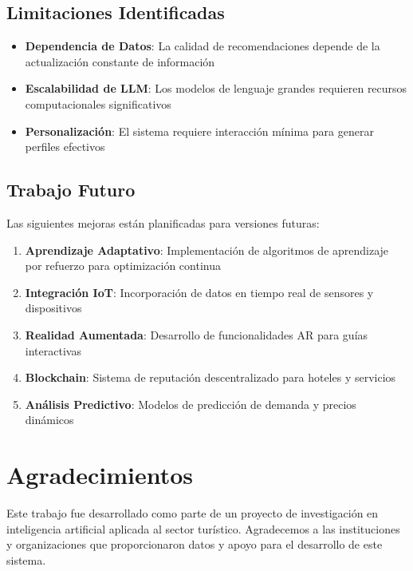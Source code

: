 \documentclass[runningheads]{llncs}
\begin{document}
\subsection{Limitaciones Identificadas}

\begin{itemize}
\item \textbf{Dependencia de Datos}: La calidad de recomendaciones depende de la actualización constante de información
\item \textbf{Escalabilidad de LLM}: Los modelos de lenguaje grandes requieren recursos computacionales significativos
\item \textbf{Personalización}: El sistema requiere interacción mínima para generar perfiles efectivos
\end{itemize}

\subsection{Trabajo Futuro}

Las siguientes mejoras están planificadas para versiones futuras:

\begin{enumerate}
\item \textbf{Aprendizaje Adaptativo}: Implementación de algoritmos de aprendizaje por refuerzo para optimización continua
\item \textbf{Integración IoT}: Incorporación de datos en tiempo real de sensores y dispositivos
\item \textbf{Realidad Aumentada}: Desarrollo de funcionalidades AR para guías interactivas
\item \textbf{Blockchain}: Sistema de reputación descentralizado para hoteles y servicios
\item \textbf{Análisis Predictivo}: Modelos de predicción de demanda y precios dinámicos
\end{enumerate}

\section{Agradecimientos}

Este trabajo fue desarrollado como parte de un proyecto de investigación en inteligencia artificial aplicada al sector turístico. Agradecemos a las instituciones y organizaciones que proporcionaron datos y apoyo para el desarrollo de este sistema.
\end{document}

